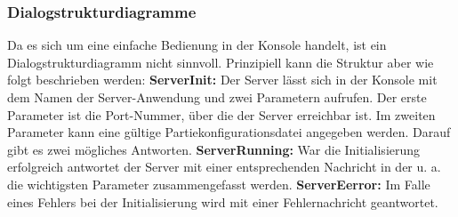 \subsubsection{Dialogstrukturdiagramme}  
Da es sich um eine einfache Bedienung in der Konsole handelt, ist ein Dialogstrukturdiagramm nicht sinnvoll. Prinzipiell kann die Struktur aber wie folgt beschrieben werden: \textbf{ServerInit:} Der Server lässt sich in der Konsole mit dem Namen der Server-Anwendung und zwei Parametern aufrufen. Der erste Parameter ist die Port-Nummer, über die der Server erreichbar ist. Im zweiten Parameter kann eine gültige Partiekonfigurationsdatei angegeben werden. Darauf gibt es zwei mögliches Antworten. \textbf{ServerRunning:} War die Initialisierung erfolgreich antwortet der Server mit einer entsprechenden Nachricht in der u. a. die wichtigsten Parameter zusammengefasst werden. \textbf{ServerEerror:} Im Falle eines Fehlers bei der Initialisierung wird mit einer Fehlernachricht geantwortet.



